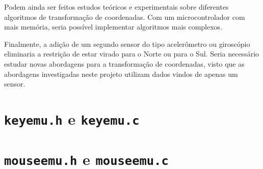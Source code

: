 \documentclass[brazil,pagestart=firstchapter]{abnt}
\begin{document}
Podem ainda ser feitos estudos teóricos e experimentais sobre diferentes
algoritmos de transformação de coordenadas. Com um microcontrolador com mais
memória, seria possível implementar algoritmos mais complexos.

Finalmente, a adição de um segundo sensor do tipo acelerômetro ou giroscópio
eliminaria a restrição de estar virado para o Norte ou para o Sul. Seria
necessário estudar novas abordagens para a transformação de coordenadas,
visto que as abordagens investigadas neste projeto utilizam dados vindos de
apenas um sensor.








\apendice


%


%


\chapter{\texttt{keyemu.h} e \texttt{keyemu.c}}
\label{ape:keyemu}

\clearpage



\chapter{\texttt{mouseemu.h} e \texttt{mouseemu.c}}
\label{ape:mouseemu}

\clearpage

\end{document}
